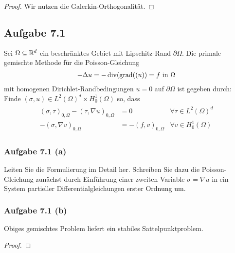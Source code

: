 \begin{proof}
	Wir nutzen die Galerkin-Orthogonalität.
\end{proof}

\subsection{Aufgabe 7.1}
Sei $\Omega\subseteq\mathbb{R}^d$ ein beschränktes Gebiet mit Lipschitz-Rand $\partial\Omega$.
Die primale gemischte Methode für die Poisson-Gleichung
\begin{align*}
	-\Delta u=-\operatorname{div}(\operatorname{grad}((u))=f\text{ in }\Omega
\end{align*}
mit homogenen Dirichlet-Randbedingungen $u=0$ auf $\partial\Omega$ ist gegeben durch:\nl
Finde $(\sigma,u)\in L^2(\Omega)^d\times H_0^1(\Omega)$ so, dass
\begin{align*}
	\begin{array}{rll}
		(\sigma,\tau)_{0,\Omega}-(\tau,\nabla u)_{0,\Omega}&=0 &\forall\tau\in L^2(\Omega)^d\\
		-(\sigma,\nabla v)_{0,\Omega}&=-(f,v)_{0,\Omega} &\forall v\in H_0^1(\Omega)
	\end{array}
\end{align*}

\subsubsection{Aufgabe 7.1 (a)}
Leiten Sie die Formulierung im Detail her.
Schreiben Sie dazu die Poisson-Gleichung zunächst durch Einführung einer zweiten Variable $\sigma=\nabla u$ in ein System partieller Differentialgleichungen erster Ordnung um.

\begin{lösung}
\end{lösung}

\subsubsection{Aufgabe 7.1 (b)}
Obiges gemischtes Problem liefert ein stabiles Sattelpunktproblem.

\begin{proof}
\end{proof}


